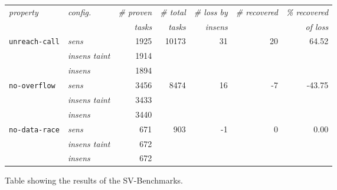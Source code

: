       \begin{figure}
        \centering
        \begin{tabular}{l|l||r|r||r|r|r}
          \textit{property} & \textit{config.} & \textit{\# proven} & \textit{\# total} & \textit{\# loss by} & \textit{\# recovered} & \textit{\% recovered}\\
            &  & \textit{tasks} & \textit{tasks} & \textit{insens} & & \textit{of loss}\\
          \hline
          \texttt{unreach-call} & \textit{sens} & 1925 & 10173 & 31 & 20 & 64.52\\
          & \textit{insens taint} & 1914 & & & & \\
          & \textit{insens} & 1894 & & & & \\
          \hline
          \texttt{no-overflow} & \textit{sens} & 3456 & 8474 & 16 & -7 & -43.75\\
          & \textit{insens taint} & 3433 & & & & \\
          & \textit{insens} & 3440 & & & & \\
          \hline
          \texttt{no-data-race} & \textit{sens} & 671 & 903 & -1 & 0 & 0.00\\
          & \textit{insens taint} & 672 & & & & \\
          & \textit{insens} & 672 & & & & \\
          \hline
        \end{tabular}
        \caption{Table showing the results of the SV-Benchmarks.}
        \label{fig:resultSVbenchTable}
      \end{figure}

